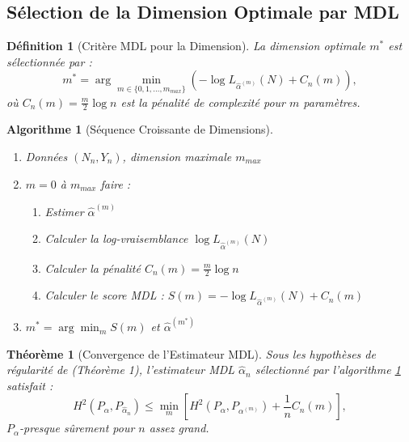 \documentclass[11pt,a4paper]{article}
\newtheorem{thm}{Théorème}[section]
\newtheorem{defi}{Définition}[section]
\newtheorem{algo}{Algorithme}[section]
\begin{document}
	\subsection{Sélection de la Dimension Optimale par MDL}
	\label{subsec:selection_dimension_mdl}
	
	\begin{defi}[Critère MDL pour la Dimension]
		\label{def:critere_mdl_dimension}
		La dimension optimale $m^*$ est sélectionnée par :
		\begin{equation}
			m^* = \arg \min_{m \in \{0, 1, \dots, m_{max}\}} \left( -\log L_{\hat{\alpha}^{(m)}}(N) + C_n(m) \right),
		\end{equation}
		où $C_n(m) = \frac{m}{2} \log n$ est la pénalité de complexité pour $m$ paramètres.
	\end{defi}
	
	\begin{algo}[Séquence Croissante de Dimensions]
		\label{algo:sequence_dimensions}
		\begin{enumerate}
			\item[\textbf{Entrée :}] Données $(N_n, Y_n)$, dimension maximale $m_{max}$
			\item[\textbf{Pour}] $m = 0$ à $m_{max}$ faire :
			\begin{enumerate}
				\item Estimer $\hat{\alpha}^{(m)}$
				\item Calculer la log-vraisemblance $\log L_{\hat{\alpha}^{(m)}}(N)$
				\item Calculer la pénalité $C_n(m) = \frac{m}{2} \log n$
				\item Calculer le score MDL : $S(m) = -\log L_{\hat{\alpha}^{(m)}}(N) + C_n(m)$
			\end{enumerate}
			\item[\textbf{Sortie :}] $m^* = \arg \min_m S(m)$ et $\hat{\alpha}^{(m^*)}$
		\end{enumerate}
	\end{algo}
	
	\begin{thm}[Convergence de l'Estimateur MDL]
		\label{thm:convergence_estimateur}
		Sous les hypothèses de régularité de \cite{versatile_main.tex} (Théorème 1), l'estimateur MDL $\hat{\alpha}_n$ sélectionné par l'algorithme \ref{algo:sequence_dimensions} satisfait :
		\begin{equation}
			H^2(P_{\alpha}, P_{\hat{\alpha}_n}) \leq \min_{m} \left[ H^2(P_{\alpha}, P_{\alpha^{(m)}}) + \frac{1}{n} C_n(m) \right],
		\end{equation}
		$P_{\alpha}$-presque sûrement pour $n$ assez grand.
	\end{thm}
	
\end{document}
